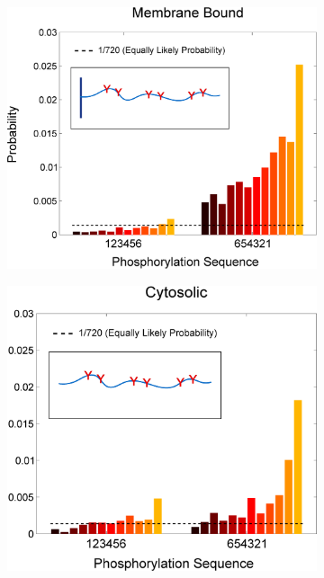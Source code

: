 \documentclass[../../AdvancementSummary.tex]{subfiles}
\begin{document}
\begin{figure}[H]
	\begin{center}
		\begin{subfigure}{0.3\linewidth}
			\includegraphics[width=\linewidth]{ResultsFigures/StiffeningSequentialBinding/MemOn/ProbVSSequence.eps}
			\caption{}
		\end{subfigure}
		\begin{subfigure}{0.3\linewidth}
			\includegraphics[width=\linewidth]{ResultsFigures/StiffeningSequentialBinding/MemOff/ProbVSSequence.eps}

\end{subfigure}
\end{center}
\end{figure}
\end{document}
